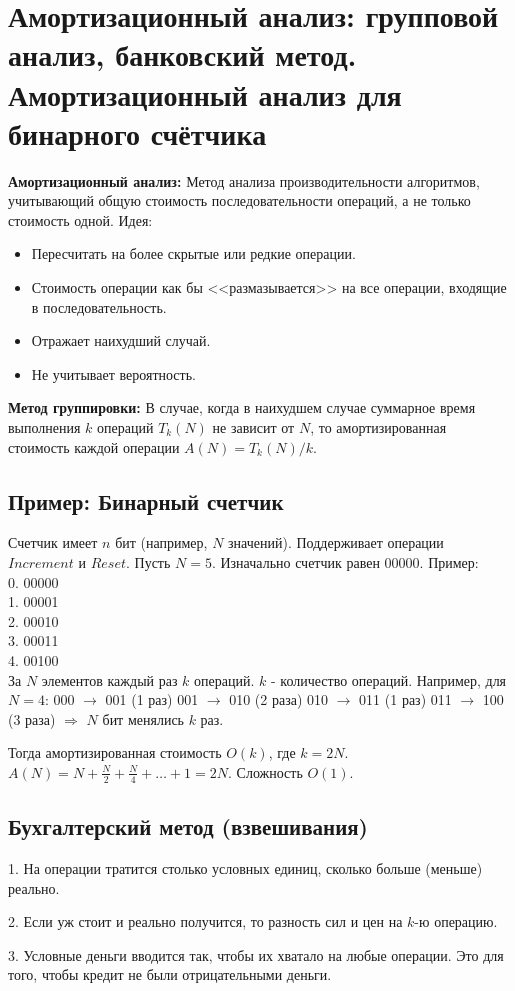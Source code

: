 \section{Амортизационный анализ: групповой анализ, банковский метод. Амортизационный анализ для бинарного счётчика }

\textbf{Амортизационный анализ:}
Метод анализа производительности алгоритмов, учитывающий общую стоимость последовательности операций, а не только стоимость одной.
Идея:
\begin{itemize}
	\item Пересчитать на более скрытые или редкие операции.
	\item Стоимость операции как бы <<размазывается>> на все операции, входящие в последовательность.
	\item Отражает наихудший случай.
	\item Не учитывает вероятность.
\end{itemize}

\textbf{Метод группировки:}
В случае, когда в наихудшем случае суммарное время выполнения $k$ операций $T_k(N)$ не зависит от $N$, то амортизированная стоимость каждой операции $A(N) = T_k(N)/k$.

\subsection*{Пример: Бинарный счетчик}
Счетчик имеет $n$ бит (например, $N$ значений).
Поддерживает операции $Increment$ и $Reset$.
Пусть $N=5$. Изначально счетчик равен 00000.
Пример:\\
0. 00000\\
1. 00001\\
2. 00010\\
3. 00011\\
4. 00100\\

За $N$ элементов каждый раз $k$ операций. $k$ - количество операций.
Например, для $N=4$:
000 $\rightarrow$ 001 (1 раз)
001 $\rightarrow$ 010 (2 раза)
010 $\rightarrow$ 011 (1 раз)
011 $\rightarrow$ 100 (3 раза)
$\Rightarrow$ $N$ бит менялись $k$ раз.

Тогда амортизированная стоимость $O(k)$, где $k=2N$.
$A(N) = N + \frac{N}{2} + \frac{N}{4} + \dots + 1 = 2N$.
Сложность $O(1)$.

\subsection*{Бухгалтерский метод (взвешивания)}
1. На операции тратится столько условных единиц, сколько больше (меньше) реально.

2. Если уж стоит и реально получится, то разность сил и цен на $k$-ю операцию.

3. Условные деньги вводится так, чтобы их хватало на любые операции. Это для того, чтобы кредит не были отрицательными деньги.

